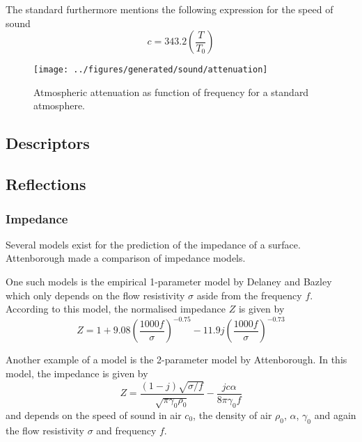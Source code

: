 The standard furthermore mentions the following expression for the speed of sound
\begin{equation}
c = 343.2 \left( \frac{T}{T_0} \right)
\end{equation}

\begin{figure}[H]
        \centering
        \texttt{[image: ../figures/generated/sound/attenuation]}
        \caption{Atmospheric attenuation as function of frequency for a standard atmosphere.}
        \label{fig:theory:sound:attenuation}
\end{figure}

\subsection{Descriptors}


\newpage
\subsection{Reflections}

\subsubsection{Impedance}
Several models exist for the prediction of the impedance of a surface.
Attenborough made a comparison of impedance models\cite{Attenborough2011a}.


One such models is the empirical 1-parameter model by Delaney and Bazley which
only depends on the flow resistivity $\sigma$ aside from the frequency $f$.
According to this model, the normalised impedance $Z$ is given by
\begin{equation}\label{eq:theory:sound:impedance:db}
 Z = 1 + 9.08 \left( \frac{1000f}{\sigma}\right)^{-0.75} - 11.9 j \left( \frac{1000f}{\sigma}\right)^{-0.73}
\end{equation}

Another example of a model is the 2-parameter model by Attenborough. In this model, the impedance is given by
\begin{equation}\label{eq:theory:sound:impedance:att}
 Z = \frac{\left( 1-j\right) \sqrt{\sigma/f}}{\sqrt{\pi \gamma_0 \rho_0}} - \frac{jc\alpha}{8 \pi \gamma_0 f}
\end{equation}
and depends on the speed of sound in air $c_0$, the density of air $\rho_0$, $\alpha$, $\gamma_0$ and again the flow resistivity $\sigma$ and frequency $f$.



